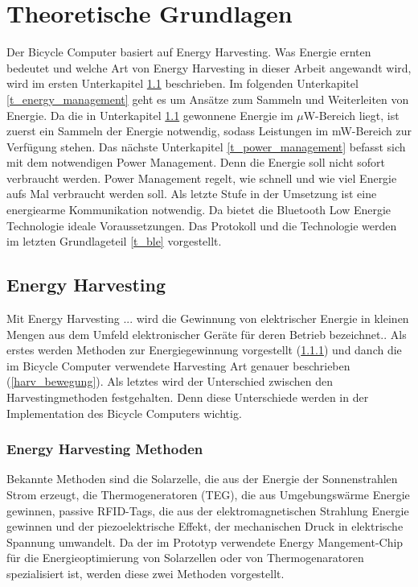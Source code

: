 \chapter{Theoretische Grundlagen}
Der Bicycle Computer basiert auf Energy Harvesting. Was Energie ernten bedeutet und welche Art von Energy Harvesting in dieser Arbeit angewandt wird, wird im ersten Unterkapitel \ref{t_harvesting} beschrieben. Im folgenden Unterkapitel \ref{t_energy_management} geht es um Ansätze zum Sammeln und Weiterleiten von Energie. Da die in Unterkapitel \ref{t_harvesting} gewonnene Energie im $\mu$W-Bereich liegt, ist zuerst ein Sammeln der Energie notwendig, sodass Leistungen im mW-Bereich zur Verfügung stehen. Das nächste Unterkapitel \ref{t_power_management} befasst sich mit dem notwendigen Power Management. Denn die
Energie soll nicht sofort verbraucht werden. Power Management regelt, wie schnell und wie viel Energie aufs Mal verbraucht werden soll. Als letzte Stufe in der Umsetzung ist eine energiearme Kommunikation notwendig. Da bietet die Bluetooth Low Energie Technologie ideale Voraussetzungen. Das Protokoll und die Technologie werden im letzten Grundlageteil \ref{t_ble} vorgestellt.


\section{Energy Harvesting}\label{t_harvesting} 

\glqq Mit Energy Harvesting ... wird die Gewinnung von elektrischer Energie in kleinen Mengen aus dem Umfeld elektronischer Geräte für deren Betrieb bezeichnet.\grqq \cite{harvesting}. Als erstes werden Methoden zur Energiegewinnung vorgestellt (\ref{harv_arten}) und danch die im Bicycle Computer verwendete Harvesting Art genauer beschrieben (\ref{harv_bewegung}). Als letztes wird der Unterschied zwischen den Harvestingmethoden festgehalten. Denn diese Unterschiede werden in der Implementation des Bicycle Computers wichtig.


\subsection{Energy Harvesting Methoden}\label{harv_arten} 

Bekannte Methoden sind die Solarzelle, die aus der Energie der Sonnenstrahlen Strom erzeugt, die Thermogeneratoren (TEG), die aus Umgebungswärme Energie gewinnen,  passive RFID-Tags, die aus der elektromagnetischen Strahlung Energie gewinnen und der piezoelektrische Effekt, der mechanischen Druck in elektrische Spannung umwandelt. Da der im Prototyp verwendete Energy Mangement-Chip \cite{datasheet_EM85} für die Energieoptimierung von Solarzellen oder von Thermogenaratoren spezialisiert ist, werden diese zwei Methoden vorgestellt. 

